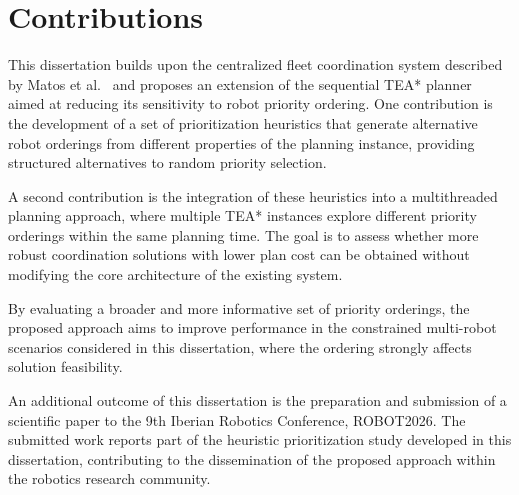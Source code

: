 \section{Contributions}
\hspace{\parindent}
This dissertation builds upon the centralized fleet coordination system described by
Matos et al.~\cite{matos2025criis} and proposes an extension of the sequential TEA* planner aimed
at reducing its sensitivity to robot priority ordering. One contribution is the development of a set
of prioritization heuristics that generate alternative robot orderings from different properties of the
planning instance, providing structured alternatives to random priority selection.

A second contribution is the integration of these heuristics into a multithreaded planning approach,
where multiple TEA* instances explore different priority orderings within the same planning time.
The goal is to assess whether more robust coordination solutions with lower plan cost can be obtained without modifying the
core architecture of the existing system.

By evaluating a broader and more informative set of priority orderings, the proposed approach aims
to improve performance in the constrained multi-robot scenarios considered in this dissertation, where the ordering strongly affects
solution feasibility. 

An additional outcome of this dissertation is the preparation and submission of a scientific paper to
the 9th Iberian Robotics Conference, ROBOT2026. The submitted work reports part of the heuristic
prioritization study developed in this dissertation, contributing to the dissemination of the proposed
approach within the robotics research community.
